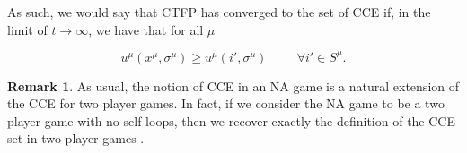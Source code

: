 \documentclass{article}
\theoremstyle{definition}
\newtheorem*{remark}{Remark}
\newcommand{\xmu}{x^{\mu}}
\newcommand{\refmu}{\sigma^{\mu}}
\begin{document}
  As such, we would say that CTFP has converged to the set of CCE if, in the limit of $t
  \rightarrow \infty$, we have that for all $\mu$

  \begin{equation}
    u^\mu (\xmu, \refmu) \geq u^\mu(i', \refmu) \hspace{1cm} \forall i' \in S^\mu.
  \end{equation}

  \begin{remark}
    As usual, the notion of CCE in an NA game is a natural extension of the CCE for two player
    games. In fact, if we consider the NA game to be a two player game with no self-loops, then
    we recover exactly the definition of the CCE set in two player games \cite{PayoffPerformance}.
  \end{remark}
\end{document}
